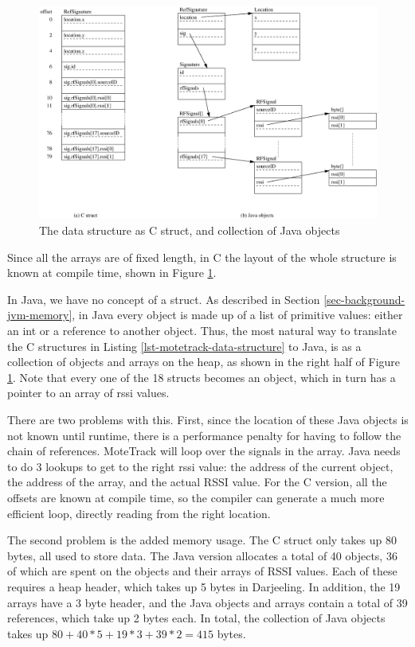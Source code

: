 \begin{figure}[]
  \centering
  \includegraphics[width=0.9\linewidth]{motetrack-refsignature-objects}
  \caption{The  data structure as C struct, and collection of Java objects}
  \label{fig-motetrack-refsignature-objects}
\end{figure}

Since all the arrays are of fixed length, in C the layout of the whole structure is known at compile time, shown in Figure \ref{fig-motetrack-refsignature-objects}.

In Java, we have no concept of a struct. As described in Section \ref{sec-background-jvm-memory}, in Java every object is made up of a list of primitive values: either an int or a reference to another object. Thus, the most natural way to translate the C structures in Listing \ref{lst-motetrack-data-structure} to Java, is as a collection of objects and arrays on the heap, as shown in the right half of Figure \ref{fig-motetrack-refsignature-objects}. Note that every one of the 18  structs becomes an object, which in turn has a pointer to an array of rssi values.

There are two problems with this. First, since the location of these Java objects is not known until runtime, there is a performance penalty for having to follow the chain of references. MoteTrack will loop over the signals in the  array. Java needs to do 3 lookups to get to the right rssi value: the address of the current  object, the address of the  array, and the actual RSSI value. For the C version, all the offsets are known at compile time, so the compiler can generate a much more efficient loop, directly reading from the right location.

The second problem is the added memory usage. The C struct only takes up 80 bytes, all used to store data. The Java version allocates a total of 40 objects, 36 of which are spent on the  objects and their arrays of RSSI values. Each of these requires a heap header, which takes up 5 bytes in Darjeeling. In addition, the 19 arrays have a 3 byte header, and the Java objects and arrays contain a total of 39 references, which take up 2 bytes each. In total, the collection of Java objects takes up $80 + 40*5 + 19*3 + 39*2 = 415$ bytes.

